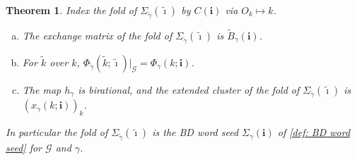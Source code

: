 \documentclass[a4paper]{amsart}
\numberwithin{equation}{section}
\newtheorem{theorem}{Theorem}[section]
\theoremstyle{definition}
\theoremstyle{remark}
\newcommand{\mcG}{\mathcal{G}}
\newcommand{\bfi}{\mathbf{i}}
\newcommand{\tbfi}{\widetilde{\boldsymbol{\imath}}}
\newcommand{\tB}{\widetilde{B}}
\newcommand{\tg}{\widetilde{\gamma}}
\begin{document}
\begin{theorem}
  \label{thm: fold}
  Index the fold of $\Sigma_{\tg}(\tbfi)$ by $C(\bfi)$ via $O_k\mapsto k$.
  \begin{enumerate}[(a)]
    \item The exchange matrix of the fold of $\Sigma_{\tg}(\tbfi)$ is $\tB_\gamma(\bfi)$.
    \item For $\widetilde{k}$ over $k$, $\Phi_{\tg}(\widetilde{k};\tbfi)|_\mcG=\Phi_\gamma(k;\bfi)$.
    \item The map $h_\gamma$ is birational, and the extended cluster of the fold of $\Sigma_{\tg}(\tbfi)$ is $(x_\gamma(k;\bfi))_k$.
  \end{enumerate}
  In particular the fold of $\Sigma_{\tg}(\tbfi)$ is the BD word seed $\Sigma_\gamma(\bfi)$ of \cref{def: BD word seed} for $\mcG$ and $\gamma$.
\end{theorem}
\end{document}
